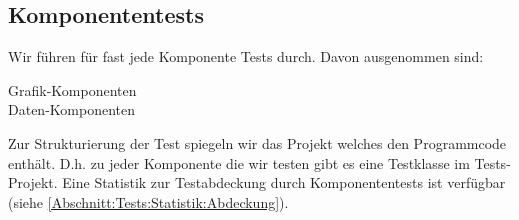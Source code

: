 %



\subsection{Komponententests}
\label{Abschnitt:Tests:Protokoll:Komponenten}


Wir führen für fast jede Komponente Tests durch. Davon ausgenommen sind:\\

\begin{description}
	
	\item[Grafik-Komponenten]
	
	
	\item[Daten-Komponenten]
	
\end{description}


Zur Strukturierung der Test spiegeln wir das Projekt welches den Programmcode enthält. D.h. zu jeder Komponente die wir testen gibt es eine Testklasse im Tests-Projekt.
Eine Statistik zur Testabdeckung durch Komponententests ist verfügbar (siehe \ref{Abschnitt:Tests:Statistik:Abdeckung}).




